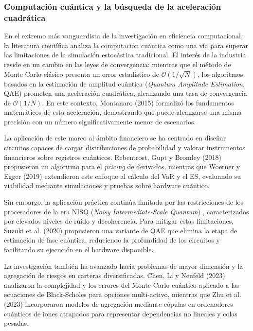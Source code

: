 \documentclass[11pt]{article}
\begin{document}
\subsubsection{Computación cuántica y la búsqueda de la aceleración cuadrática}

En el extremo más vanguardista de la investigación en eficiencia computacional, la literatura científica analiza la computación cuántica como una vía para superar las limitaciones de la simulación estocástica tradicional. El interés de la industria reside en un cambio en las leyes de convergencia: mientras que el método de Monte Carlo clásico presenta un error estadístico de $\mathcal{O}(1/\sqrt{N})$, los algoritmos basados en la estimación de amplitud cuántica (\textit{Quantum Amplitude Estimation}, QAE) prometen una aceleración cuadrática, alcanzando una tasa de convergencia de $\mathcal{O}(1/N)$. En este contexto, Montanaro (2015) \cite{montanaro2015quantum} formalizó los fundamentos matemáticos de esta aceleración, demostrando que puede alcanzarse una misma precisión con un número significativamente menor de escenarios.

La aplicación de este marco al ámbito financiero se ha centrado en diseñar circuitos capaces de cargar distribuciones de probabilidad y valorar instrumentos financieros sobre registros cuánticos. Rebentrost, Gupt y Bromley (2018) \cite{rebentrost2018quantum} propusieron un algoritmo para el \textit{pricing} de derivados, mientras que Woerner y Egger (2019) \cite{woerner2019quantum} extendieron este enfoque al cálculo del VaR y el ES, evaluando su viabilidad mediante simulaciones y pruebas sobre hardware cuántico.

Sin embargo, la aplicación práctica continúa limitada por las restricciones de los procesadores de la era NISQ (\textit{Noisy Intermediate-Scale Quantum}) \cite{preskill2018quantum}, caracterizados por elevados niveles de ruido y decoherencia. Para mitigar estas limitaciones, Suzuki et al. (2020) \cite{suzuki2020amplitude} propusieron una variante de QAE que elimina la etapa de estimación de fase cuántica, reduciendo la profundidad de los circuitos y facilitando su ejecución en el hardware disponible.

La investigación también ha avanzado hacia problemas de mayor dimensión y la agregación de riesgos en carteras diversificadas. Chen, Li y Neufeld (2023) \cite{chen2023quantum} analizaron la complejidad y los errores del Monte Carlo cuántico aplicado a las ecuaciones de Black-Scholes para opciones multi-activo, mientras que Zhu et al. (2023) \cite{zhu2023copula} incorporaron modelos de agregación mediante cópulas en ordenadores cuánticos de iones atrapados para representar dependencias no lineales y colas pesadas.
\end{document}
